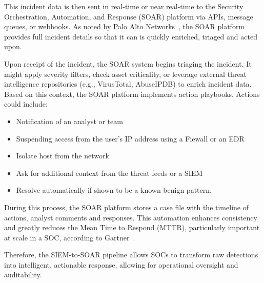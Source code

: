 This incident data is then sent in real-time or near real-time to the Security Orchestration, Automation, and Response (SOAR) platform via APIs, message queues, or webhooks. As noted by Palo Alto Networks~\cite{paloalto}, the SOAR platform provides full incident details so that it can is quickly enriched, triaged and acted upon.

Upon receipt of the incident, the SOAR system begins triaging the incident. It might apply severity filters, check asset criticality, or leverage external threat intelligence repositories (e.g., VirusTotal, AbuseIPDB) to enrich incident data. Based on this context, the SOAR platform implements action playbooks. Actions could include:

\begin{itemize}[itemsep=0pt,parsep=0pt,topsep=0pt,partopsep=0pt]
    \item Notification of an analyst or team
    \item Suspending access from the user's IP address using a Fiewall or an EDR
    \item Isolate host from the network
    \item Ask for additional context from the threat feeds or a SIEM
    \item Resolve automatically if shown to be a known benign pattern.
\end{itemize}

During this process, the SOAR platform stores a case file with the timeline of actions, analyst comments and responses. This automation enhances consistency and greatly reduces the Mean Time to Respond (MTTR), particularly important at scale in a SOC, according to Gartner~\cite{gartner-siem-soar}.

Therefore, the SIEM-to-SOAR pipeline allows SOCs to transform raw detections into intelligent, actionable response, allowing for operational oversight and auditability.

